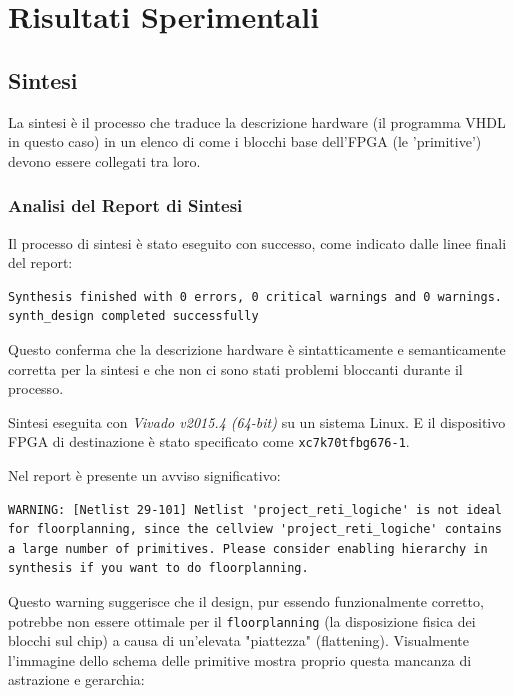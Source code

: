 \documentclass{article}
\begin{document}
\section{Risultati Sperimentali}

\subsection{Sintesi}

La sintesi è il processo che traduce la descrizione hardware (il programma VHDL in questo caso) in un elenco di come i blocchi base dell'FPGA (le 'primitive') devono essere collegati tra loro.

\subsubsection{Analisi del Report di Sintesi}
\label{ssec:analisi_sintesi}

Il processo di sintesi è stato eseguito con successo, come indicato dalle linee finali del report:
\begin{lstlisting}[caption={Messaggi di successo della sintesi}, label={lst:sintesi_successo}, breaklines=true]
Synthesis finished with 0 errors, 0 critical warnings and 0 warnings.
synth_design completed successfully
\end{lstlisting}
Questo conferma che la descrizione hardware è sintatticamente e semanticamente corretta per la sintesi e che non ci sono stati problemi bloccanti durante il processo.

\noindent Sintesi eseguita con \textit{Vivado v2015.4 (64-bit)} su un sistema Linux. E il dispositivo FPGA di destinazione è stato specificato come \texttt{xc7k70tfbg676-1}.

\noindent Nel report è presente un avviso significativo:

\begin{lstlisting}[label={lst:sintesi_successo}, breaklines=true]
WARNING: [Netlist 29-101] Netlist 'project_reti_logiche' is not ideal for floorplanning, since the cellview 'project_reti_logiche' contains a large number of primitives. Please consider enabling hierarchy in synthesis if you want to do floorplanning.
\end{lstlisting}

\noindent Questo warning suggerisce che il design, pur essendo funzionalmente corretto, potrebbe non essere ottimale per il \texttt{floorplanning} (la disposizione fisica dei blocchi sul chip) a causa di un'elevata "piattezza" (flattening). Visualmente l'immagine dello schema delle primitive mostra proprio questa mancanza di astrazione e gerarchia:
\end{document}
